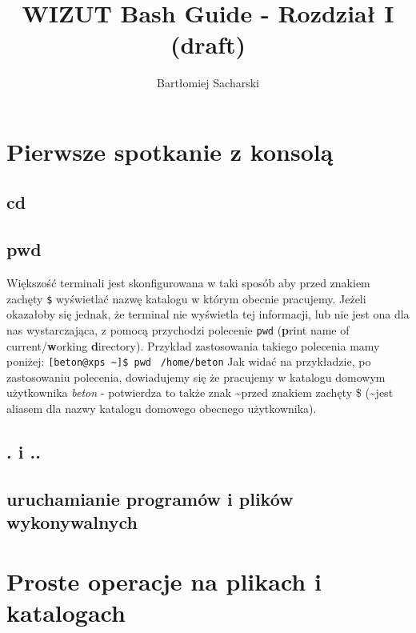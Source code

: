\documentclass[10 pt, a4paper, draft]{article}
\author{Bartłomiej Sacharski}
\title{WIZUT Bash Guide - Rozdział I (draft)}
\begin{document}
\maketitle
\tableofcontents
\newpage

\section{Pierwsze spotkanie z konsolą}
\subsection{cd}

\subsection{pwd}
Większość terminali jest skonfigurowana w taki sposób aby przed znakiem zachęty \texttt{\$} wyświetlać nazwę katalogu w którym obecnie pracujemy. Jeżeli okazałoby się jednak, że terminal nie wyświetla tej informacji, lub nie jest ona dla nas wystarczająca, z pomocą przychodzi polecenie \texttt{pwd} (\textbf{p}rint name of current/\textbf{w}orking \textbf{d}irectory). Przykład zastosowania takiego polecenia mamy poniżej:
\newline
\texttt{[beton@xps \textasciitilde]\$ pwd } \newline %
\texttt{/home/beton} \newline 
Jak widać na przykładzie, po zastosowaniu polecenia, dowiadujemy się że pracujemy w katalogu domowym użytkownika \textit{beton} - potwierdza to także znak \textasciitilde przed znakiem zachęty \$ (\textasciitilde jest aliasem dla nazwy katalogu domowego obecnego użytkownika).

\subsection{. i ..}

\subsection{uruchamianie programów i plików wykonywalnych}

\newpage
\section{Proste operacje na plikach i katalogach}
\end{document}
